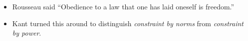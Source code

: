 \begin{itemize}
\item Rousseau said ``Obedience to a law that one has laid oneself is freedom.''
\item Kant turned this around to distinguish \emph{constraint by norms} from \emph{constraint by power}.
\end{itemize}